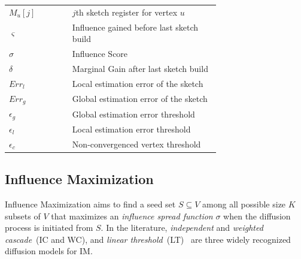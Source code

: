 \documentclass[10pt,journal,compsoc]{IEEEtran}
\begin{document}
\begin{table}[!ht]
\begin{tabular}{|l|p{0.7\linewidth}|}
        $M_u[j]$        & $j$th sketch register for vertex $u$\\
        $\varsigma $    & Influence gained before last sketch build\\
        $\sigma $       & Influence Score\\
        $\delta$        & Marginal Gain after last sketch build\\
        $Err_l$         & Local estimation error of the sketch\\
        $Err_g$         & Global estimation error of the sketch\\
        $\epsilon_{g}$    & Global estimation error threshold\\
        $\epsilon_{l}$    & Local estimation error threshold\\ 
        $\epsilon_{c}$    & Non-convergenced vertex threshold\\
        \hline         
    \end{tabular}
\end{table}
\subsection{Influence Maximization}

Influence Maximization aims to find a seed set $S \subseteq V$ among all possible size $K$ subsets of $V$ that maximizes an {\em influence spread function} $\sigma$  when the diffusion process is initiated from $S$. %
In the literature, {\em independent} and {\em weighted cascade}~(IC and WC), and 
{\em linear threshold}~(LT)~\cite{kempe2003maximizing} are three widely recognized diffusion models for IM. 
\end{document}
